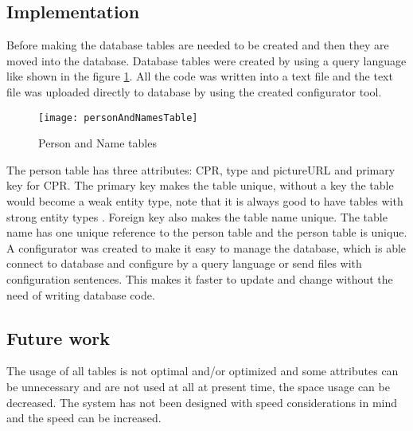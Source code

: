 \subsection{Implementation}

Before making the database tables are needed to be created and then they are moved into the database. Database tables were created by using a query language like shown in the figure \ref{fig:personAndNamesTable}. All the code was written into a text file and the text file was uploaded directly to database by using the created configurator tool.

\begin{figure}[h]
	\centering
		\texttt{[image: personAndNamesTable]}
	\caption{Person and Name tables}
	\label{fig:personAndNamesTable}
\end{figure}

The person table has three attributes: CPR, type and pictureURL and primary key for CPR. The primary key makes the table unique, without a key the table would become a weak entity type, note that it is always good to have tables with strong entity types \cite{bib4}. Foreign key also makes the table name unique. The table name has one unique reference to the person table and the person table is unique. \\ A configurator was created to make it easy to manage the database, which is able connect to database and configure by a query language or send files with configuration sentences. This makes it faster to update and change without the need of writing database code. 

\subsection{Future work}

The usage of all tables is not optimal and/or optimized and some attributes can be unnecessary and are not used at all at present time, the space usage can be decreased. The system has not been designed with speed considerations in mind and the speed can be increased.